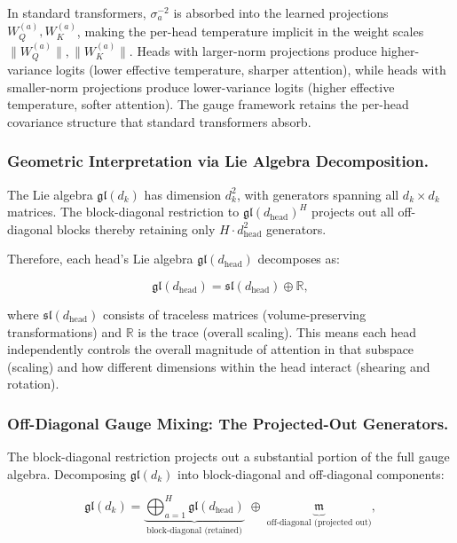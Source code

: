 \documentclass[twoside,11pt]{article}
\begin{document}
In standard transformers, $\sigma_a^{-2}$ is absorbed into the learned projections $W_Q^{(a)}, W_K^{(a)}$, making the per-head temperature implicit in the weight scales $\|W_Q^{(a)}\|, \|W_K^{(a)}\|$. Heads with larger-norm projections produce higher-variance logits (lower effective temperature, sharper attention), while heads with smaller-norm projections produce lower-variance logits (higher effective temperature, softer attention). The gauge framework retains the per-head covariance structure that standard transformers absorb.

\subsubsection{Geometric Interpretation via Lie Algebra Decomposition.}

The Lie algebra $\mathfrak{gl}(d_k)$ has dimension $d_k^2$, with generators spanning all $d_k \times d_k$ matrices. The block-diagonal restriction to $\mathfrak{gl}(d_{\text{head}})^H$ projects out all off-diagonal blocks thereby retaining only $H \cdot d_{\text{head}}^2$ generators.

Therefore, each head's Lie algebra $\mathfrak{gl}(d_{\text{head}})$ decomposes as:

\begin{equation}
\mathfrak{gl}(d_{\text{head}}) = \mathfrak{sl}(d_{\text{head}}) \oplus \mathbb{R},
\end{equation}

where $\mathfrak{sl}(d_{\text{head}})$ consists of traceless matrices (volume-preserving transformations) and $\mathbb{R}$ is the trace (overall scaling). This means each head independently controls the overall magnitude of attention in that subspace (scaling) and how different dimensions within the head interact (shearing and rotation).

\subsubsection{Off-Diagonal Gauge Mixing: The Projected-Out Generators.}
\label{sec:off_diagonal_mixing}

The block-diagonal restriction projects out a substantial portion of the full gauge algebra. Decomposing $\mathfrak{gl}(d_k)$ into block-diagonal and off-diagonal components:

\begin{equation}
\mathfrak{gl}(d_k) = \underbrace{\bigoplus_{a=1}^{H} \mathfrak{gl}(d_{\text{head}})}_{\text{block-diagonal (retained)}} \;\oplus\; \underbrace{\mathfrak{m}}_{\text{off-diagonal (projected out)}},
\label{eq:lie_algebra_decomposition}
\end{equation}
\end{document}
